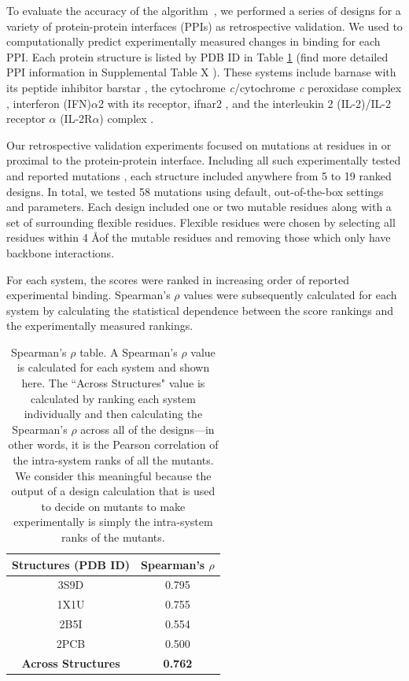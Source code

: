 To evaluate the accuracy of the \osprey \ks algorithm~\cite{K*}, we performed a series of designs for a variety of protein-protein interfaces (PPIs) as retrospective validation. We used \ks to computationally predict experimentally measured changes in binding for each PPI. Each protein structure is listed by PDB ID in Table \ref{table:spearman} \cite{pdb1x1u,pdb2pcb,pdb3s9d,pdb2b5i}(find more detailed PPI information in Supplemental Table X ).  These systems include barnase with its peptide inhibitor barstar \cite{binding2barnase,bindingbarnase}, the cytochrome {\it c}/cytochrome {\it c} peroxidase complex \cite{bindingcytc}, interferon (IFN)$\alpha$2 with its receptor, ifnar2  \cite{bindingifna2}, and the interleukin 2 (IL-2)/IL-2 receptor $\alpha$ (IL-2R$\alpha$) complex \cite{bindingil2}.

Our retrospective validation experiments focused on mutations at residues in or proximal to the protein-protein interface. Including all such experimentally tested and reported mutations \cite{binding2barnase,bindingbarnase,bindingcytc,bindingifna2,bindingil2}, each structure included anywhere from 5 to 19 ranked designs. In total, we tested 58 mutations using default, out-of-the-box \osprey settings and parameters. Each design included one or two mutable residues along with a set of surrounding flexible residues. Flexible residues were chosen by selecting all residues within 4 \AA of the mutable residues and removing those which only have backbone interactions. 

For each system, the \ks scores were ranked in increasing order of reported experimental binding. Spearman's $\rho$ values were subsequently calculated for each system by calculating the statistical dependence between the \ks score rankings and the experimentally measured rankings. 

\begin{table}[h!]\label{table:spearman}
\centering
\begin{tabular}{ |c||c|  }
 \hline
 \textbf{Structures (PDB ID)}& \textbf{Spearman's $\rho$} \\
 \hline 
 3S9D   & 0.795 \\
 \hline
 1X1U   & 0.755 \\
 \hline
 2B5I   & 0.554 \\
 \hline
 2PCB   & 0.500 \\
 \hline
 \textbf{Across Structures} &   \textbf{0.762}  \\
 \hline
\end{tabular}
\caption{Spearman's $\rho$ table. A Spearman's $\rho$ value is calculated for each system and shown here. The ``Across Structures" value is calculated by ranking each system individually and then calculating the Spearman's $\rho$ across all of the designs---in other words, it is the Pearson correlation of the intra-system ranks of all the mutants.  We consider this meaningful because the output of a design calculation that is used to decide on mutants to make experimentally is simply the intra-system ranks of the mutants.  }
\end{table}

